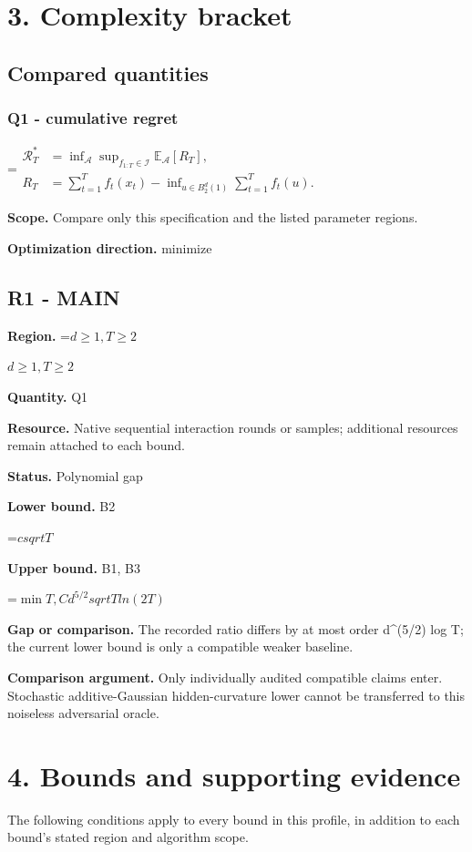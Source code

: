 \documentclass[10pt,a4paper]{article}
\newcommand{\AtlasMath}[1]{\par\begingroup\centering\setbox0=\hbox{$\displaystyle #1$}\ifdim\wd0>1.4\linewidth\typeout{ATLAS WIDE FORMULA: \the\wd0}\fi\ifdim\wd0>\linewidth\resizebox{\linewidth}{!}{\box0}\else\box0\fi\par\endgroup}
\newcommand{\AtlasInlineMath}[1]{\begingroup\setbox0=\hbox{$#1$}\ifdim\wd0>.4\linewidth\endgroup\AtlasMath{#1}\else\endgroup$#1$\fi}
\begin{document}
\section{3. Complexity bracket}
\subsection{Compared quantities}
\subsubsection{Q1 - cumulative regret}
\AtlasMath{\begin{aligned}\mathcal R_T^*&=\inf_{\mathcal A}\sup_{f_{1:T}\in\mathcal I}\mathbb E_{\mathcal A}[R_T],\\ R_T&=\sum_{t=1}^T f_t(x_t)-\inf_{u\in B_2^d(1)}\sum_{t=1}^T f_t(u).\end{aligned}}
\textbf{Scope.} Compare only this specification and the listed parameter regions.

\textbf{Optimization direction.} minimize

\subsection{R1 - MAIN}
\textbf{Region.} \AtlasInlineMath{d\ge 1,T\ge 2}

\textbf{Quantity.} Q1

\textbf{Resource.} Native sequential interaction rounds or samples; additional resources remain attached to each bound.

\textbf{Status.} Polynomial gap

\textbf{Lower bound.} B2

\AtlasMath{c sqrtT}
\textbf{Upper bound.} B1, B3

\AtlasMath{\min{T,C d^{5/2}sqrtT ln(2T)}}
\textbf{Gap or comparison.} The recorded ratio differs by at most order d\textasciicircum{}(5/2) log T; the current lower bound is only a compatible weaker baseline.

\textbf{Comparison argument.} Only individually audited compatible claims enter. Stochastic additive-Gaussian hidden-curvature lower cannot be transferred to this noiseless adversarial oracle.

\section{4. Bounds and supporting evidence}
The following conditions apply to every bound in this profile, in addition to each bound's stated region and algorithm scope.
\end{document}
